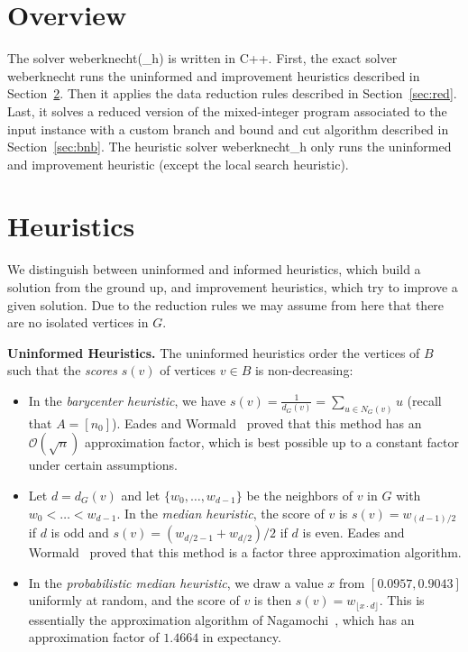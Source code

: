 \documentclass[a4paper,UKenglish,cleveref, autoref, thm-restate]{lipics-v2021}
\begin{document}

\section{Overview}
The solver \textsf{weberknecht(\_h)} is written in C++.
First, the exact solver \textsf{weberknecht} runs the uninformed and improvement heuristics described in Section~\ref{sec:heu}.
Then it applies the data reduction rules described in Section~\ref{sec:red}.
Last, it solves a reduced version of the mixed-integer program associated to the input instance with a custom branch and bound and cut algorithm described in Section~\ref{sec:bnb}.
The heuristic solver \textsf{weberknecht\_h} only runs the uninformed and improvement heuristic (except the local search heuristic).


\section{Heuristics}\label{sec:heu}
We distinguish between uninformed and informed heuristics, which build a solution from the ground up, and improvement heuristics, which try to improve a given solution.
Due to the reduction rules we may assume from here that there are no isolated vertices in $G$.

\medskip
\noindent
\textbf{Uninformed Heuristics.}
The uninformed heuristics order the vertices of $B$ such that the \emph{scores} $s(v)$ of vertices $v \in B$ is non-decreasing:
\begin{itemize}
\item In the \emph{barycenter heuristic}, we have $s(v) = \frac{1}{d_G(v)} = \sum_{u \in N_G(v)} u$ (recall that $A = [n_0]$). Eades and Wormald~\cite{eades1994edge} proved that this method has an $\mathcal{O}(\sqrt{n})$ approximation factor, which is best possible up to a constant factor under certain assumptions.
\item Let $d = d_G(v)$ and let $\{w_0, \dots, w_{d-1}\}$ be the neighbors of $v$ in $G$ with $w_0 < \dots < w_{d-1}$.
In the \emph{median heuristic}, the score of $v$ is $s(v) = w_{(d-1)/2}$ if $d$ is odd and $s(v) = (w_{d/2 - 1} + w_{d/2})/2$ if $d$ is even.
Eades and Wormald~\cite{eades1994edge} proved that this method is a factor three approximation algorithm.
\item In the \emph{probabilistic median heuristic}, we draw a value $x$ from $[0.0957, 0.9043]$ uniformly at random, and the score of $v$ is then $s(v) = w_{\lfloor x \cdot d \rfloor}$.
This is essentially the approximation algorithm of Nagamochi~\cite{nagamochi2005improved}, which has an approximation factor of $1.4664$ in expectancy.
\end{itemize}
\end{document}
